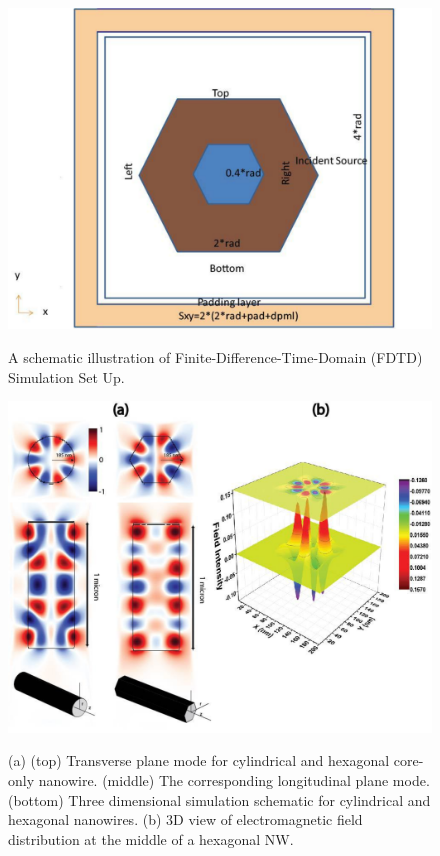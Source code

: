 \begin{figure}
  \caption{A schematic illustration of Finite-Difference-Time-Domain (FDTD) Simulation Set Up.}
  \centering
  \includegraphics[width=\textwidth]{pictures/LM/MeepSchematic}
  \label{MeepSchematic}
\end{figure}

\begin{figure}
  \caption{(a) (top) Transverse plane mode for cylindrical and hexagonal core-only nanowire. (middle) The corresponding longitudinal plane mode. (bottom) Three dimensional simulation schematic for cylindrical and hexagonal nanowires. (b) 3D view of electromagnetic field distribution at the middle of a hexagonal NW.}
  \centering
  \includegraphics[width=\textwidth,height=0.7\textheight]{pictures/LM/NWsketch}
  \label{NWsketch}
\end{figure}

